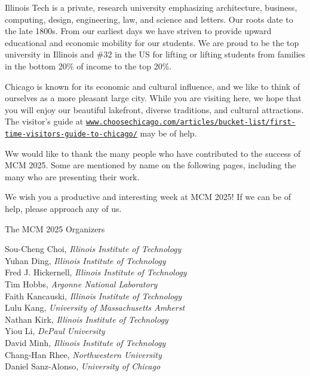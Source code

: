 Illinois Tech is a private, research university emphasizing architecture, business, computing, design, engineering, law, and science and letters.  Our roots date to the late 1800s.  From our earliest days we have striven to provide upward educational and economic mobility for our students.  We are proud to be the top university in Illinois and \#32 in the US for lifting or lifting students from families in the bottom 20\% of income to the top 20\%.

Chicago is known for its economic and cultural influence, and we like to think of ourselves as a more pleasant large city.
While you are visiting here, we hope that you will enjoy our beautiful lakefront, diverse traditions, and cultural attractions. The visitor's guide at \href{https://www.choosechicago.com/articles/bucket-list/first-time-visitors-guide-to-chicago/}{\nolinkurl{www.choosechicago.com/articles/bucket-list/first-time-visitors-guide-to-chicago/}} may be of help.

Ww would like to thank the many people who have contributed to the success of MCM 2025.  Some are mentioned by name on the following pages, including the many who are presenting their work.

We wish you a productive and interesting week at MCM 2025! If we can be of help, please approach any of us.


\vspace{1.5ex}

The MCM 2025 Organizers

\vspace{0.2ex}

Sou-Cheng Choi, \emph{Illinois Institute of Technology} \\
Yuhan Ding, \emph{Illinois Institute of Technology} \\
Fred J. Hickernell, \emph{Illinois Institute of Technology} \\
Tim Hobbs, \emph{Argonne National Laboratory} \\
Faith Kancauski, \emph{Illinois Institute of Technology} \\
Lulu Kang, \emph{University of Massachusetts Amherst} \\
Nathan Kirk, \emph{Illinois Institute of Technology} \\
Yiou Li, \emph{DePaul University} \\
David Minh, \emph{Illinois Institute of Technology} \\
Chang-Han Rhee, \emph{Northwestern University} \\
Daniel Sanz-Alonso, \emph{University of Chicago}


